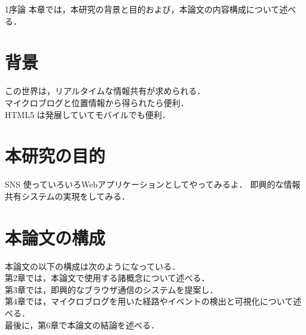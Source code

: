 \chapterhead
{1}{序論}
{本章では，本研究の背景と目的および，本論文の内容構成について述べる．}

\section{背景}
この世界は，リアルタイムな情報共有が求められる．\\
マイクロブログと位置情報から得られたら便利．\\
HTML5 は発展していてモバイルでも便利．\\

\section{本研究の目的}
SNS 使っていろいろWebアプリケーションとしてやってみるよ．
即興的な情報共有システムの実現をしてみる．

\section{本論文の構成}
本論文の以下の構成は次のようになっている．\\
第2章では，本論文で使用する諸概念について述べる．\\
第3章では，即興的なブラウザ通信のシステムを提案し．\\
第4章では，マイクロブログを用いた経路やイベントの検出と可視化について述べる．\\
最後に，第6章で本論文の結論を述べる．\\

